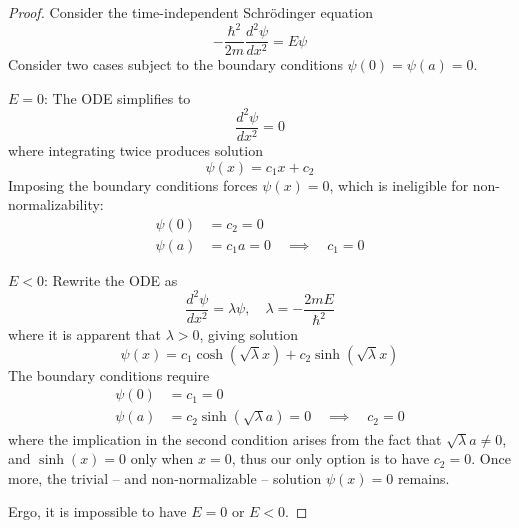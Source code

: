 \documentclass[a4paper]{article}
\begin{document}
\begin{proof}[Proof]
Consider the time-independent Schr\"odinger equation
\[
	-\frac{\hbar^{2}}{2m}\frac{d^2 \psi}{d x^2} = E \psi 
\]
Consider two cases subject to the boundary conditions \( \psi \!\left( 0 \right) = \psi \!\left( a \right) = 0 \).

\underline{\( E = 0 \)}: The ODE simplifies to
\[
	\frac{d^2 \psi}{d x^2} = 0 
\]
where integrating twice produces solution
\[
	\psi \!\left( x \right) = c_{1}x + c_{2} 
\]
Imposing the boundary conditions forces \( \psi \!\left( x \right) = 0 \), which is ineligible for non-normalizability:
\begin{align*}
	\psi \!\left( 0 \right) & = c_{2} = 0 \\
	\psi \!\left( a \right) & = c_{1}a = 0 \quad \implies \quad c_{1} = 0
\end{align*}

\underline{\( E < 0 \)}: Rewrite the ODE as 
\[
	\frac{d^2 \psi}{d x^2} = \lambda \psi, \quad \lambda = -\frac{2mE}{\hbar^{2}} 
\]
where it is apparent that \( \lambda > 0 \), giving solution
\[
	\psi \!\left( x \right) = c_{1}\cosh\!\left(\sqrt{\lambda}x\right) + c_{2}\sinh\!\left(\sqrt{\lambda}x\right) 
\]
The boundary conditions require
\begin{align*}
	\psi \!\left( 0 \right) & = c_{1} = 0 \\
	\psi \!\left( a \right) & = c_{2}\sinh\!\left(\sqrt{\lambda}a\right) = 0 \quad \implies \quad c_{2} = 0
\end{align*}
where the implication in the second condition arises from the fact that \( \sqrt{\lambda}a \neq 0 \), and \( \sinh\!\left(x\right) = 0 \) only when \( x = 0 \), thus our only option is to have \( c_{2} = 0 \). Once more, the trivial -- and non-normalizable -- solution \( \psi \!\left( x \right) = 0 \) remains.

Ergo, it is impossible to have \( E = 0 \) or \( E < 0 \).
\end{proof}

\end{document}
